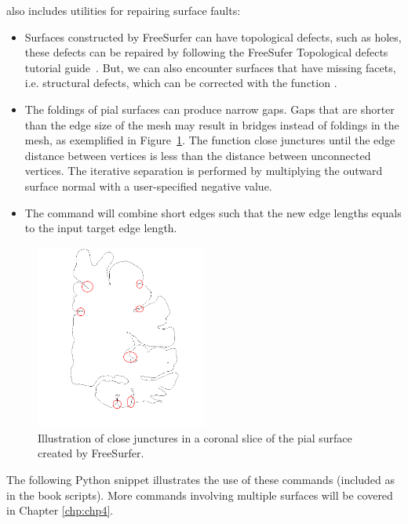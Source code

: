 \svmtk{} also includes utilities for repairing surface faults:
\begin{itemize}
\item
  Surfaces constructed by FreeSurfer can have topological defects,
  such as holes, these defects can be repaired by following the
  FreeSufer Topological defects tutorial guide~\cite{freesurfer-wiki}.
  But, we can also encounter surfaces that have missing facets,
  i.e. structural defects, which can be corrected with the \svmtk{}
  function .
\item
  The foldings of pial surfaces can produce narrow gaps. Gaps that are
  shorter than the edge size of the mesh may result in bridges instead
  of foldings in the mesh, as exemplified in
  Figure~\ref{fig:chp3:juncture}. The function
  close junctures until the edge distance between vertices is less
  than the distance between unconnected vertices. The iterative
  separation is performed by multiplying the outward surface normal
  with a user-specified negative value. 
\item 
  The command  will combine short edges
  such that the new edge lengths equals to the input target edge
  length.
\end{itemize}
\begin{figure}\sidecaption
  \includegraphics[width=0.5\textwidth]{./chapters/chp3/FIG/juncturers-gap.png}
  \caption{Illustration of close junctures in a coronal
    slice of the pial surface created by FreeSurfer.}
  \label{fig:chp3:juncture}
\end{figure}
The following Python snippet illustrates the use of these commands
(included as  in the
book scripts). More commands involving multiple surfaces will be
covered in Chapter \ref{chp:chp4}.

